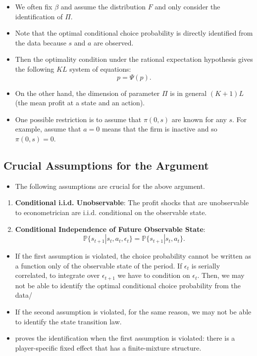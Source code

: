 \documentclass[
]{book}
\providecommand{\tightlist}{%
  \setlength{\itemsep}{0pt}\setlength{\parskip}{0pt}}
\begin{document}
\begin{itemize}
\tightlist
\item
  We often fix \(\beta\) and assume the distribution \(F\) and only consider the identification of \(\Pi\).
\item
  Note that the optimal conditional choice probability is directly identified from the data because \(s\) and \(a\) are observed.
\item
  Then the optimality condition under the rational expectation hypothesis gives the following \(KL\) system of equations:
  \[
  p = \Psi(p).
  \]
\item
  On the other hand, the dimension of parameter \(\Pi\) is in general \((K + 1)L\) (the mean profit at a state and an action).
\item
  One possible restriction is to assume that \(\pi(0, s)\) are known for any \(s\). For example, assume that \(a = 0\) means that the firm is inactive and so \(\pi(0, s) = 0\).
\end{itemize}

\hypertarget{crucial-assumptions-for-the-argument}{%
\subsection{Crucial Assumptions for the Argument}\label{crucial-assumptions-for-the-argument}}

\begin{itemize}
\tightlist
\item
  The following assumptions are crucial for the above argument.
\end{itemize}

\begin{enumerate}
\def\labelenumi{\arabic{enumi}.}
\tightlist
\item
  \textbf{Conditional i.i.d. Unobservable}: The profit shocks that are unobservable to econometrician are i.i.d. conditional on the observable state.
\item
  \textbf{Conditional Independence of Future Observable State}:
  \begin{equation}
  \mathbb{P}\{s_{t + 1}|s_t, a_t, \epsilon_t\} = \mathbb{P}\{s_{t + 1}|s_t, a_t\}.
  \end{equation}
\end{enumerate}

\begin{itemize}
\tightlist
\item
  If the first assumption is violated, the choice probability cannot be written as a function only of the observable state of the period. If \(\epsilon_t\) is serially correlated, to integrate over \(\epsilon_{t + 1}\) we have to condition on \(\epsilon_t\). Then, we may not be able to identify the optimal conditional choice probability from the data/
\item
  If the second assumption is violated, for the same reason, we may not be able to identify the state transition law.
\item
  \citet{kasaharaNonparametricIdentificationFinite2009} proves the identification when the first assumption is violated: there is a player-specific fixed effect that has a finite-mixture structure.
\end{itemize}
\end{document}
